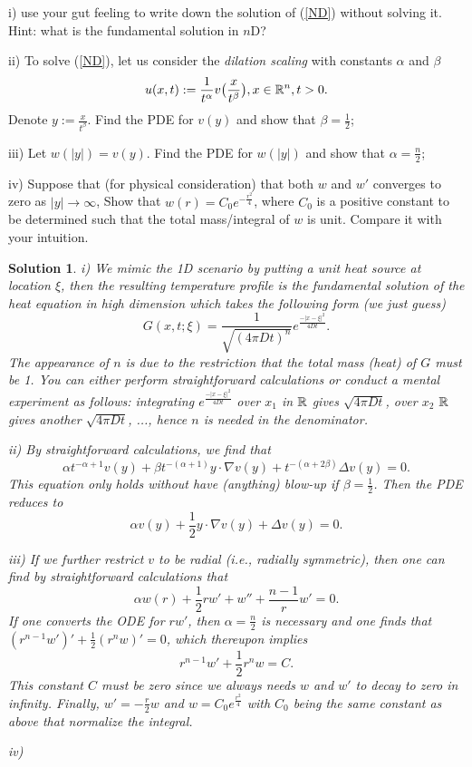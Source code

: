 \documentclass[6pt]{article}
\newtheorem{solution}{Solution}
\numberwithin{equation}{section}
\def\mathbb{\Bbb}
\begin{document}
\begin{enumerate}
i) use your gut feeling to write down the solution of (\ref{ND}) without solving it.  Hint: what is the fundamental solution in $n$D?

ii) To solve (\ref{ND}), let us consider the \emph{dilation scaling} with constants $\alpha$ and $\beta$
\[u(x,t):=\frac{1}{t^\alpha}v\big(\frac{x}{t^\beta}\big),x\in\mathbb R^n,t>0.\]
Denote $y:=\frac{x}{t^\beta}$.  Find the PDE for $v(y)$ and show that $\beta=\frac{1}{2}$;

iii) Let $w(|y|)=v(y)$.  Find the PDE for $w(|y|)$ and show that $\alpha=\frac{n}{2}$;

iv) Suppose that (for physical consideration) that both $w$ and $w'$ converges to zero as $|y|\rightarrow\infty$,  Show that $w(r)=C_0e^{-\frac{r^2}{4}}$, where $C_0$ is a positive constant to be determined such that the total mass/integral of $w$ is unit.  Compare it with your intuition.
\begin{solution}
i) We mimic the 1D scenario by putting a unit heat source at location $\xi$, then the resulting temperature profile is the fundamental solution of the heat equation in high dimension which takes the following form (we just guess)
\[G(x,t;\xi)=\frac{1}{\sqrt{(4\pi Dt)^n}}e^\frac{-|x-\xi|^2}{4Dt}.\]
The appearance of $n$ is due to the restriction that the total mass (heat) of $G$ must be 1.  You can either perform straightforward calculations or conduct a mental experiment as follows: integrating $e^\frac{-|x-\xi|^2}{4Dt}$ over $x_1$ in $\mathbb R$ gives $\sqrt{4\pi Dt}$, over $x_2$ $\mathbb R$ gives another $\sqrt{4\pi Dt}$, ..., hence $n$ is needed in the denominator.  

ii)  By straightforward calculations, we find that 
\[\alpha t^{-\alpha+1}v(y)+\beta t^{-(\alpha+1)}y\cdot \nabla v(y)+t^{-(\alpha+2\beta)}\Delta v(y)=0.\]
This equation only holds without have (anything) blow-up if $\beta=\frac{1}{2}$.  Then the PDE reduces to 
\[\alpha v(y)+ \frac{1}{2}y\cdot \nabla v(y)+ \Delta v(y)=0.\]

iii) If we further restrict $v$ to be radial (i.e., radially symmetric), then one can find by straightforward calculations that 
\[\alpha w(r)+ \frac{1}{2}r w'+w''+\frac{n-1}{r}w'=0.\]
If one converts the ODE for $rw'$, then $\alpha=\frac{n}{2}$ is necessary and one finds that $(r^{n-1}w')'+\frac{1}{2}(r^nw)'=0$, which thereupon implies
\[r^{n-1}w'+\frac{1}{2}r^nw=C.\]
This constant $C$ must be zero since we always needs $w$ and $w'$ to decay to zero in infinity.  Finally, $w'=-\frac{r}{2}w$ and $w=C_0e^\frac{r^2}{4}$ with $C_0$ being the same constant as above that normalize the integral. 

iv)
\end{solution}


\end{enumerate}
\end{document}
